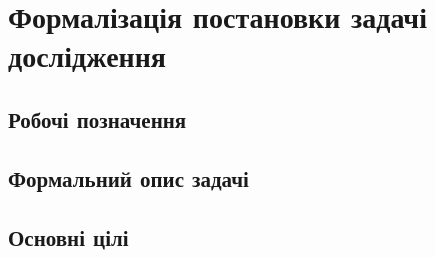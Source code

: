 \section{Формалізація постановки задачі дослідження}
\subsection{Робочі позначення}

\subsection{Формальний опис задачі}

\subsection{Основні цілі}